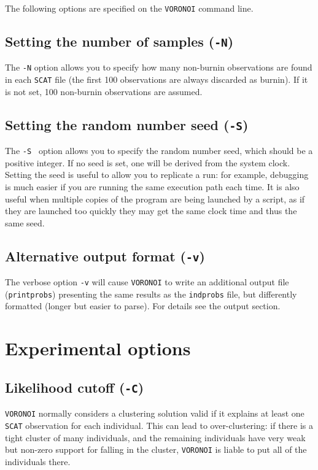 \documentclass[10pt,titlepage,times,letterpaper]{article}
\def\SCAT{{\tt SCAT} }
\def\VORONOI{{\tt VORONOI} }
\begin{document}
The following options are specified on the \VORONOI command line.

\subsection{Setting the number of samples ({\tt -N})}

The {\tt -N} option allows you to specify how many non-burnin observations are found in each
\SCAT file (the first 100 observations are always discarded as burnin).  If it is not set,
100 non-burnin observations are assumed.

\subsection{Setting the random number seed  ({\tt -S})}

The {\tt -S } option allows you to specify the random number seed, which should be a
positive integer.  If no seed is set, one will be derived from the system clock.
Setting the seed is useful to allow you to replicate a run:  for example, debugging is
much easier if you are running the same execution path each time.
It is also useful when multiple copies of the program are being launched by a script,
as if they are launched too quickly they may get the same clock time and thus the same seed.

\subsection{Alternative output format  ({\tt -v})}

The verbose option {\tt -v} will cause \VORONOI to write an additional output
file ({\tt printprobs}) presenting the same results as the {\tt indprobs} file, but differently formatted (longer
but easier to parse).  For details see the output section.

\section{Experimental options}

\subsection{Likelihood cutoff ({\tt -C})}

\VORONOI normally considers a clustering solution valid if it explains at least
one \SCAT observation for each individual.  This can lead to over-clustering:  if there
is a tight cluster of many individuals, and the remaining individuals have very weak but
non-zero support for falling in the cluster, \VORONOI is liable to put all of the individuals
there.
\end{document}
